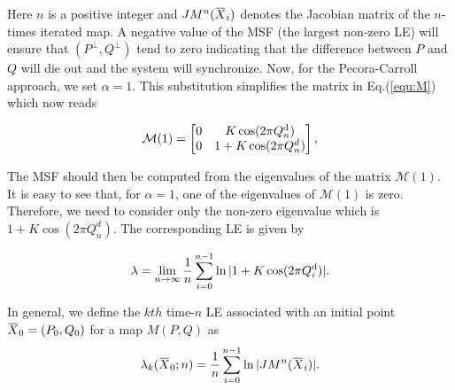 \documentclass[reprint,amsmath,amssymb,aps,pre]{revtex4-1}
\newcommand{\overbar}[1]{\mkern 1.5mu\overline{\mkern-1.5mu#1\mkern-1.5mu}\mkern 1.5mu}
\begin{document}
Here $n$ is a positive integer and $JM^n(\overbar{X}_i)$ denotes the Jacobian matrix of the $n$-times iterated map.  A negative value of the MSF (the largest non-zero LE) will ensure that $(P^\perp,Q^\perp) $ tend to zero indicating that the difference between $P$ and $Q$ will die out and the system will synchronize. Now, for the Pecora-Carroll approach, we set $\alpha = 1$. This substitution simplifies the matrix in Eq.(\ref{equ:M}) which now reads

\begin{equation} 
\mathcal{M}(1)= \begin{bmatrix} 0 & K\cos(2\pi Q^\textnormal{d}_n) \\ 0 & 1 + K\cos(2\pi 
Q^d_n) \end{bmatrix},
\end{equation}

The MSF should then be computed from the eigenvalues of the matrix $\mathcal{M}(1)$. It is easy to see that, for $\alpha =1$, one of the eigenvalues of   $\mathcal{M}(1)$ is zero. Therefore, we need to consider only the non-zero eigenvalue which is $1+K\cos(2\pi Q^d_n)$. The corresponding LE is given by

\begin{equation}
\label{equ:LE}
\lambda   = \lim_{n \rightarrow \infty} 
\frac{1}{n}\sum^{n-1}_{i=0}\ln|1+K\cos(2\pi Q^\textnormal{d}_i)|.
\end{equation}

In general, we define the $kth$ time-$n$ LE associated with an initial point $\overbar{X}_0 = (P_0,Q_0)$ for a map $M(P,Q)$ as
\begin{equation}
\label{equ:FLEf}
\lambda _k(\overbar{X}_0;n)  = 
\frac{1}{n}\sum^{n-1}_{i=0}\ln|JM^n(\overbar{X}_i)|.
\end{equation}
\end{document}
